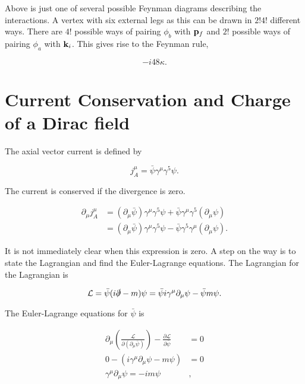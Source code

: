 \documentclass[11pt, a4paper]{amsart}
\begin{document}
Above is just one of several possible Feynman diagrams describing the interactions. A vertex with six external legs as this can be drawn in $2!4!$ different ways. There are $4!$ possible ways of pairing $\phi_b$ with $\vb{p}_f$ and $2!$ possible ways of pairing $\phi_a$ with $\vb{k}_i$. This gives rise to the Feynman rule,

\begin{equation}
-i48\kappa.
\end{equation}


\section{Current Conservation and Charge of a Dirac field}
The axial vector current is defined by

\begin{equation}
j_A^\mu = \bar{\psi} \gamma^\mu \gamma^5 \psi.
\end{equation}

The current is conserved if the divergence is zero.

\begin{align}
\partial_\mu j_A^\mu 
&= (\partial_\mu \bar{\psi} ) \gamma^\mu \gamma^5 \psi + \bar{\psi} \gamma^\mu \gamma^5 (\partial_\mu \psi) \\
&= (\partial_\mu \bar{\psi} ) \gamma^\mu \gamma^5 \psi  - \bar{\psi} \gamma^5 \gamma^\mu (\partial_\mu \psi) \label{eq:current1}.
\end{align}

It is not immediately clear when this expression is zero. A step on the way is to state the Lagrangian and find the Euler-Lagrange equations. The Lagrangian for the Lagrangian is

\begin{equation}
\mathcal{L} = \bar{\psi}(i \slashed{\partial} - m) \psi =  \bar{\psi}i\gamma^\mu \partial_\mu \psi - \bar{\psi}m\psi.
\end{equation}

The Euler-Lagrange equations for $\bar{\psi}$ is

\begin{align}
\partial_\mu \left(\frac{\mathcal{L}}{\partial (\partial_\mu \bar{\psi})} \right) - \frac{\partial \mathcal{L}}{\partial \bar{\psi}} &= 0 \\
0 - (i\gamma^\mu\partial_\mu\psi - m \psi) &= 0	\\
\gamma^\mu\partial_\mu \psi = -im\psi& \label{eq:psibarEQM},
\end{align}
\end{document}
